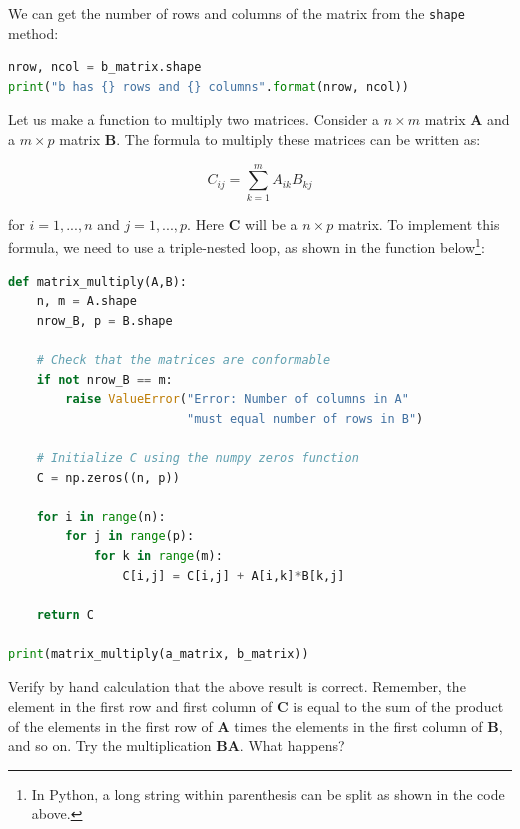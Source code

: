 \documentclass[a4paper , 12pt]{book}
\newcommand{\code}[1]{\colorbox{light-gray}{\texttt{#1}}}
\begin{document}
We can get the number of rows and columns of the matrix from the \code{shape} method:

\begin{center}
\begin{lstlisting}[language=Python, frame=single]
nrow, ncol = b_matrix.shape
print("b has {} rows and {} columns".format(nrow, ncol))
\end{lstlisting}
\end{center}

Let us make a function to multiply two matrices. Consider a $n\times m$ matrix \textbf{A} and a $m\times p$ matrix \textbf{B}. The formula to multiply these matrices can be written as:

\begin{equation}
    C_{ij} = \sum_{k=1}^m A_{ik}B_{kj}
\end{equation}

for $i = 1,...,n$ and $j = 1,...,p$. Here \textbf{C} will be a $n\times p$ matrix. To implement this formula, we need to use a triple-nested loop, as shown in the function below\footnote{In Python, a long string within parenthesis can be split as shown in the code above.}:

\begin{center}
\begin{lstlisting}[language=Python, frame=single]
def matrix_multiply(A,B):
    n, m = A.shape
    nrow_B, p = B.shape
    
    # Check that the matrices are conformable
    if not nrow_B == m:
        raise ValueError("Error: Number of columns in A" 
                         "must equal number of rows in B")
    
    # Initialize C using the numpy zeros function
    C = np.zeros((n, p))
    
    for i in range(n):
        for j in range(p):
            for k in range(m):
                C[i,j] = C[i,j] + A[i,k]*B[k,j]
                
    return C

print(matrix_multiply(a_matrix, b_matrix))
\end{lstlisting}   
\fbox{
\parbox{\textwidth - 2 \fboxsep}{
\*[[23.  35.]\\
 \*[53.  83.]\\
 \*[83. 131.]]
}}    
\end{center}

Verify by hand calculation that the above result is correct. Remember, the element in the first row and first column of \textbf{C} is equal to the sum of the product of the elements in the first row of \textbf{A} times the elements in the first column of \textbf{B}, and so on. Try the multiplication \textbf{BA}. What happens?
\end{document}
